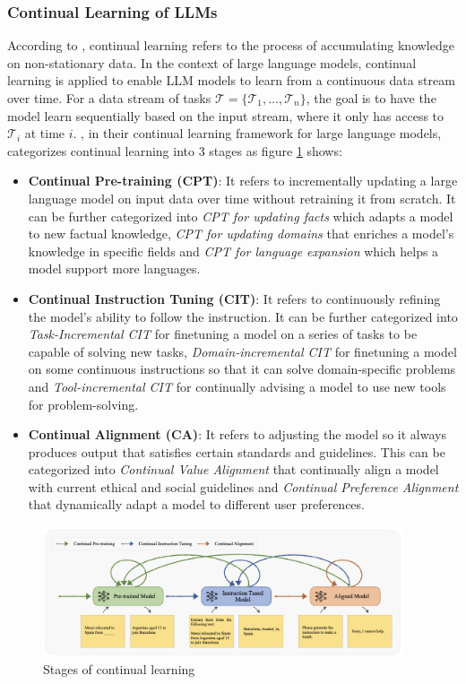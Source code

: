 \documentclass[runningheads]{llncs}
\begin{document}
\subsubsection{Continual Learning of LLMs} 
\noindent \newline
According to \cite{Biesi20}, continual learning refers to the process of accumulating knowledge on non-stationary data. In the context of large language models, continual learning is applied to enable LLM models
to learn from a continuous data stream over time. For a data stream of tasks $\mathcal{T}= \{\mathcal{T}_1,\ldots,\mathcal{T}_n \}$, the goal is to
have the model learn sequentially based on the input stream, where it only has access to $\mathcal{T}_i$ at time $i$. \cite{Wu24}, in their continual learning framework for large language models, categorizes 
continual learning into 3 stages as figure \ref{fig:acl_stages} shows:
\begin{itemize}
  \item \textbf{Continual Pre-training (CPT)}: It refers to incrementally updating a large language model on input data over time without retraining it from scratch. It can be further categorized into 
  \textit{CPT for updating facts} which adapts a model to new factual knowledge, \textit{CPT for updating domains} that enriches a model's knowledge in specific fields and \textit{CPT for language expansion} which helps a model
  support more languages.
  \item \textbf{Continual Instruction Tuning (CIT)}: It refers to continuously refining the model's ability to follow the instruction. It can be further categorized into \textit{Task-Incremental CIT} for finetuning a model on a series 
  of tasks to be capable of solving new tasks, \textit{Domain-incremental CIT} for finetuning a model on some continuous instructions so that it can solve domain-specific problems and \textit{Tool-incremental CIT} for 
  continually advising a model to use new tools for problem-solving.
  \item \textbf{Continual Alignment (CA)}: It refers to adjusting the model so it always produces output that satisfies certain standards and guidelines. This can be categorized into \textit{Continual Value Alignment} that continually
  align a model with current ethical and social guidelines and \textit{Continual Preference Alignment} that dynamically adapt a model to different user preferences.
\end{itemize}
\begin{figure}[htbp]
  \centering
  \includegraphics[width=0.95\textwidth]{CL stages.png}
  \caption{Stages of continual learning \cite{Wu24}}
  \label{fig:acl_stages}
\end{figure}
\end{document}
